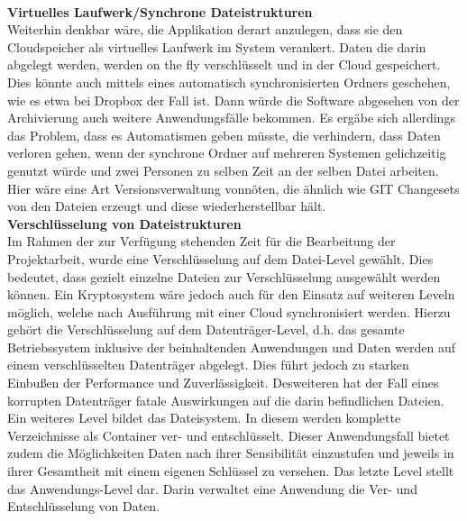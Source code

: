 \documentclass[12pt,a4paper,bibliography=totocnumbered,listof=totocnumbered]{scrartcl}
\begin{document}
\\\textbf{Virtuelles Laufwerk/Synchrone Dateistrukturen}\\
Weiterhin denkbar wäre, die Applikation derart anzulegen, dass sie den Cloudspeicher als virtuelles Laufwerk im System verankert. Daten die darin abgelegt werden, werden on the fly verschlüsselt und in der Cloud gespeichert. Dies könnte auch mittels eines automatisch synchronisierten Ordners geschehen, wie es etwa bei Dropbox der Fall ist. Dann würde die Software abgesehen von der Archivierung auch weitere Anwendungsfälle bekommen. Es ergäbe sich allerdings das Problem, dass es Automatismen geben müsste, die verhindern, dass Daten verloren gehen, wenn der synchrone Ordner auf mehreren Systemen gelichzeitig genutzt würde und zwei Personen zu selben Zeit an der selben Datei arbeiten. Hier wäre eine Art Versionsverwaltung vonnöten, die ähnlich wie GIT Changesets von den Dateien erzeugt und diese wiederherstellbar hält.
\\\textbf{Verschlüsselung von Dateistrukturen}\\
Im Rahmen der zur Verfügung stehenden Zeit für die Bearbeitung der Projektarbeit, wurde eine Verschlüsselung auf dem Datei-Level gewählt. Dies bedeutet, dass gezielt einzelne Dateien zur Verschlüsselung ausgewählt werden können. Ein Kryptosystem wäre jedoch auch für den Einsatz auf weiteren Leveln möglich, welche nach Ausführung mit einer Cloud synchronisiert werden. Hierzu gehört die Verschlüsselung auf dem Datenträger-Level, d.h. das gesamte Betriebssystem inklusive der beinhaltenden Anwendungen und Daten werden auf einem verschlüsselten Datenträger abgelegt. Dies führt jedoch zu starken Einbußen der Performance und Zuverlässigkeit. Desweiteren hat der Fall eines korrupten Datenträger fatale Auswirkungen auf die darin befindlichen Dateien. Ein weiteres Level bildet das Dateisystem. In diesem werden komplette Verzeichnisse als Container ver- und entschlüsselt. Dieser Anwendungsfall bietet zudem die Möglichkeiten Daten nach ihrer Sensibilität einzustufen und jeweils in ihrer Gesamtheit mit einem eigenen Schlüssel zu versehen. Das letzte Level stellt das Anwendungs-Level dar. Darin verwaltet eine Anwendung die Ver- und Entschlüsselung von Daten. \\
\cite{38}
\end{document}
